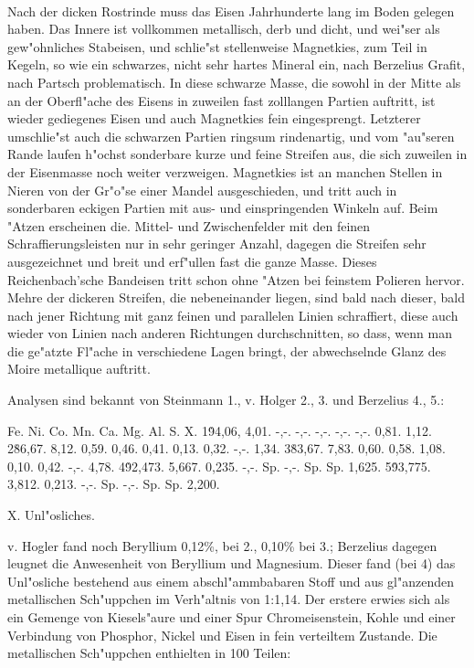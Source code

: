\documentclass[a4paper, 11pt, oneside]{article}
\begin{document}
\paragraph{}
Nach der dicken Rostrinde muss das Eisen Jahrhunderte lang im Boden gelegen haben. Das Innere ist vollkommen metallisch, derb und dicht, und wei"ser als gew"ohnliches Stabeisen, und schlie"st stellenweise Magnetkies, zum Teil in Kegeln, so wie ein schwarzes, nicht sehr hartes Mineral ein, nach Berzelius Grafit, nach Partsch problematisch. In diese schwarze Masse, die sowohl in der Mitte als an der Oberfl"ache des Eisens in zuweilen fast zolllangen Partien auftritt, ist wieder gediegenes Eisen und auch Magnetkies fein eingesprengt. Letzterer umschlie"st auch die schwarzen Partien ringsum rindenartig, und vom "au"seren Rande laufen h"ochst sonderbare kurze und feine Streifen aus, die sich zuweilen in der Eisenmasse noch weiter verzweigen. Magnetkies ist an manchen Stellen in Nieren von der Gr"o"se einer Mandel ausgeschieden, und tritt auch in sonderbaren eckigen Partien mit aus- und einspringenden Winkeln auf. Beim "Atzen erscheinen die. Mittel- und Zwischenfelder mit den feinen Schraffierungsleisten nur in sehr geringer Anzahl, dagegen die Streifen sehr ausgezeichnet und breit und erf"ullen fast die ganze Masse. Dieses Reichenbach'sche Bandeisen tritt schon ohne "Atzen bei feinstem Polieren hervor. Mehre der dickeren Streifen, die nebeneinander liegen, sind bald nach dieser, bald nach jener Richtung mit ganz feinen und parallelen Linien schraffiert, diese auch wieder von Linien nach anderen Richtungen durchschnitten, so dass, wenn man die ge"atzte Fl"ache in verschiedene Lagen bringt, der abwechselnde Glanz des Moire metallique auftritt.

Analysen sind bekannt von Steinmann 1., v. Holger 2., 3. und Berzelius 4., 5.:

Fe. Ni. Co. Mn. Ca. Mg. Al. S. X.  
1\. 94,06, 4,01. -,-. -,-. -,-. -,-. -,-. 0,81. 1,12.  
2\. 86,67. 8,12. 0,59. 0,46. 0,41. 0,13. 0,32. -,-. 1,34.  
3\. 83,67. 7,83. 0,60. 0,58. 1,08. 0,10. 0,42. -,-. 4,78.  
4\. 92,473. 5,667. 0,235. -,-. Sp. -,-. Sp. Sp. 1,625.  
5\. 93,775. 3,812. 0,213. -,-. Sp. -,-. Sp. Sp. 2,200.

X. Unl"osliches.

v. Hogler fand noch Beryllium 0,12\%, bei 2., 0,10\% bei 3.; Berzelius dagegen leugnet die Anwesenheit von Beryllium und Magnesium. Dieser fand (bei 4) das Unl"osliche bestehend aus einem abschl"ammbabaren Stoff und aus gl"anzenden metallischen Sch"uppchen im Verh"altnis von 1:1,14. Der erstere erwies sich als ein Gemenge von Kiesels"aure und einer Spur Chromeisenstein, Kohle und einer Verbindung von Phosphor, Nickel und Eisen in fein verteiltem Zustande. Die metallischen Sch"uppchen enthielten in 100 Teilen:
\end{document}
